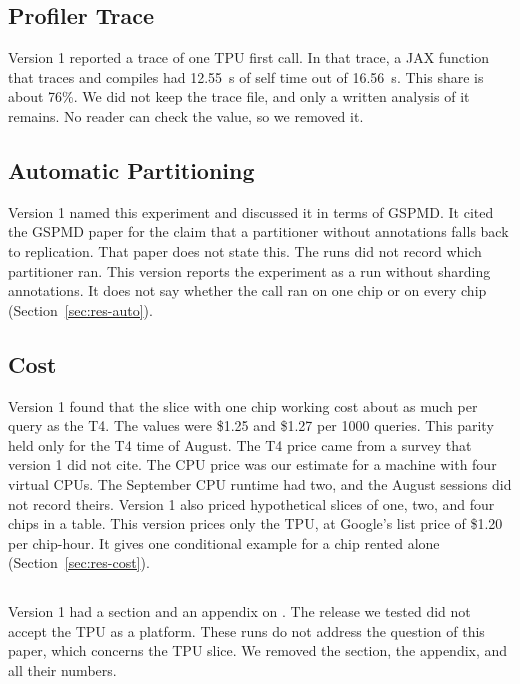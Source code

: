 \subsection*{Profiler Trace}
Version 1 reported a trace of one TPU first call.
In that trace, a JAX function that traces and compiles had 12.55~s of self time out of 16.56~s. This share is about 76\%. %
We did not keep the trace file, and only a written analysis of it remains. No reader can check the value, so we
removed it.

\subsection*{Automatic Partitioning}
Version 1 named this experiment  and discussed it in terms of GSPMD. It cited the GSPMD
paper for the claim that a partitioner without annotations falls back to replication. That paper does not state this.
The runs did not record which partitioner ran. This version reports the experiment as a run without sharding
annotations. It does not say whether the call ran on one chip or on every chip (Section~\ref{sec:res-auto}).

\subsection*{Cost}
Version 1 found that the slice with one chip working cost about as much per query as the T4.
The values were \$1.25 and \$1.27 per 1000 queries. %
This parity held only for the T4 time of August. The T4 price came from a survey that version 1 did not cite. The CPU
price was our estimate for a machine with four virtual CPUs. The September CPU runtime had two, and the August sessions
did not record theirs.
Version 1 also priced hypothetical slices of one, two, and four chips in a table. This version prices only the TPU, at Google's list price of \$1.20 per chip-hour. %
It gives one conditional example for a chip rented alone (Section~\ref{sec:res-cost}).

\subsection*{\AFthree{}}
Version 1 had a section and an appendix on \AFthree{}. The release we tested did not accept the TPU as a platform.
These runs do not address the question of this paper, which concerns the TPU slice. We removed the section, the
appendix, and all their numbers.

